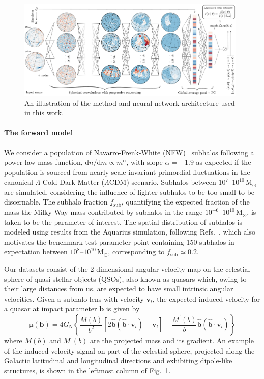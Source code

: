 \documentclass[preprint]{article}
\begin{document}
\begin{figure}[!htbp]
\centering
\includegraphics[width=0.98\textwidth]{figures/drawing.pdf}
\caption{An illustration of the method and neural network architecture used in this work.}
\label{fig:model}
\end{figure}

\paragraph{The forward model} We consider a population of Navarro-Frenk-White (NFW)~\cite{Navarro:1995iw} subhalos following a power-law mass function, $\mathrm dn / \mathrm dm \propto m^\alpha$, with slope $\alpha = -1.9$ as expected if the population is sourced from nearly scale-invariant primordial fluctuations in the canonical $\Lambda$ Cold Dark Matter ($\Lambda$CDM) scenario. 
Subhalos between $10^7$--$10^{10}\,\mathrm{M}_\odot$ are simulated, considering the influence of lighter subhalos to be too small to be discernable.
The subhalo fraction $f_\mathrm{sub}$, quantifying the expected fraction of the mass the Milky Way mass contributed by subhalos in the range $10^{-6}$--$10^{10}\,\mathrm{M}_\odot$, is taken to be the parameter of interest. The spatial distribution of subhalos is modeled using results from the Aquarius simulation, following Refs.~\cite{Hutten:2016jko,Springel:2008cc}, which also motivates the benchmark test parameter point containing 150 subhalos in expectation between $10^{8}$--$10^{10}\,\mathrm{M}_\odot$, corresponding to $f_\mathrm{sub} \simeq 0.2$.

Our datasets consist of the 2-dimensional angular velocity map on the celestial sphere of quasi-stellar objects (QSOs), also known as quasars which, owing to their large distances from us, are expected to have small intrinsic angular velocities. 
Given a subhalo lens with velocity $\mathbf{v}_{l}$, the expected induced velocity for a quasar at impact parameter $\mathbf{b}$ is given by~\cite{VanTilburg:2018ykj,Mishra-Sharma:2020ynk}
\begin{equation}
    \boldsymbol{\mu}(\mathbf{b})=4 G_{\mathrm{N}}\left\{\frac{M(b)}{b^{2}}\left[2 \hat{\mathbf{b}}\left(\hat{\mathbf{b}} \cdot \mathbf{v}_{l}\right)-\mathbf{v}_{l}\right]-\frac{M^{\prime}(b)}{b} \hat{\mathbf{b}}\left(\hat{\mathbf{b}} \cdot \mathbf{v}_{l}\right)\right\}
\end{equation}
where $M(b)$ and $M^{\prime}(b)$ are the projected mass and its gradient. An example of the induced velocity signal on part of the celestial sphere, projected along the Galactic  latitudinal and longitudinal directions and exhibiting dipole-like structures, is shown in the leftmost column of Fig.~\ref{fig:model}.
\end{document}
